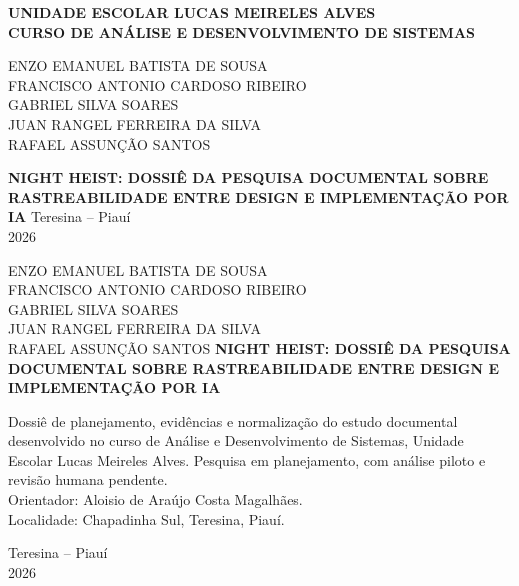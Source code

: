 \documentclass[12pt,a4paper]{article}
\renewcommand{\contentsname}{SUMÁRIO}
\begin{document}
\begin{titlepage}
\centering
\textbf{UNIDADE ESCOLAR LUCAS MEIRELES ALVES}\\
\textbf{CURSO DE ANÁLISE E DESENVOLVIMENTO DE SISTEMAS}\par
\vspace{2cm}
ENZO EMANUEL BATISTA DE SOUSA\\
FRANCISCO ANTONIO CARDOSO RIBEIRO\\
GABRIEL SILVA SOARES\\
JUAN RANGEL FERREIRA DA SILVA\\
RAFAEL ASSUNÇÃO SANTOS\par
\vfill
\textbf{NIGHT HEIST: DOSSIÊ DA PESQUISA DOCUMENTAL SOBRE RASTREABILIDADE ENTRE DESIGN E IMPLEMENTAÇÃO POR IA}
\vfill
Teresina -- Piauí\\2026
\end{titlepage}
\thispagestyle{empty}
\begin{center}
ENZO EMANUEL BATISTA DE SOUSA\\FRANCISCO ANTONIO CARDOSO RIBEIRO\\GABRIEL SILVA SOARES\\JUAN RANGEL FERREIRA DA SILVA\\RAFAEL ASSUNÇÃO SANTOS
\vspace{2cm}
\textbf{NIGHT HEIST: DOSSIÊ DA PESQUISA DOCUMENTAL SOBRE RASTREABILIDADE ENTRE DESIGN E IMPLEMENTAÇÃO POR IA}
\end{center}
\vspace{1.5cm}
\hfill\begin{minipage}{0.55\textwidth}
\singlespacing
Dossiê de planejamento, evidências e normalização do estudo documental desenvolvido no curso de Análise e Desenvolvimento de Sistemas, Unidade Escolar Lucas Meireles Alves. Pesquisa em planejamento, com análise piloto e revisão humana pendente.\\[1em]
Orientador: Aloisio de Araújo Costa Magalhães.\\[1em]
Localidade: Chapadinha Sul, Teresina, Piauí.
\end{minipage}
\vfill\begin{center}Teresina -- Piauí\\2026\end{center}
\clearpage\renewcommand{\contentsname}{SUMÁRIO}\tableofcontents\thispagestyle{empty}
\clearpage



\end{document}
